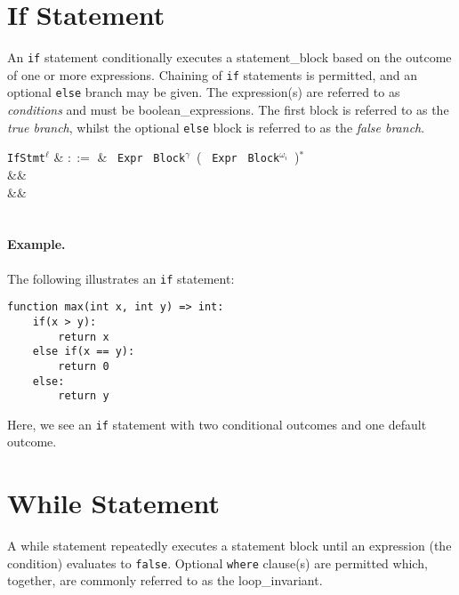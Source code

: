 \section{If Statement}
\label{c_stmts_if}
An \lstinline{if} statement conditionally executes a \gls{statement_block} based on the outcome of one or more expressions.  Chaining of \lstinline{if} statements is permitted, and an optional \lstinline{else} branch may be given.  The expression(s) are referred to as {\em conditions} and must be \gls{boolean_expression}s.  The first block is referred to as the {\em true branch}, whilst the optional \lstinline{else} block is referred to as the {\em false branch}.

\begin{syntax}
  \verb+IfStmt+$^\ell$ & $::=$ & \ \verb+Expr+\ \token{:}
  \verb+Block+$^\gamma$\ \big(  \ \verb+Expr+\ \token{:}
  \verb+Block+$^{\omega_i}$\ \big)$^*$ \\
&& \\
&&\\
\\
\end{syntax}

\paragraph{Example.} The following illustrates an \lstinline{if} statement:

\begin{lstlisting}
function max(int x, int y) => int:
    if(x > y):
        return x
    else if(x == y):
        return 0
    else:
        return y
\end{lstlisting}
Here, we see an \lstinline{if} statement with two conditional outcomes
and one default outcome.


\section{While Statement}
\label{c_stmts_while}
A while statement repeatedly executes a statement block until an expression (the condition) evaluates to \lstinline{false}.  Optional \lstinline{where} clause(s) are permitted which, together, are commonly referred to as the \gls{loop_invariant}.  

